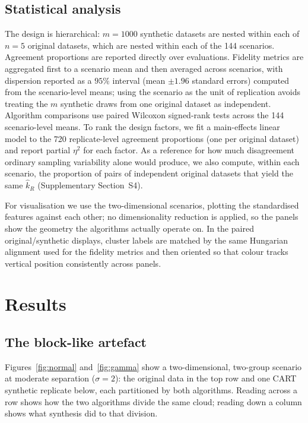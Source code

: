 \documentclass[pdflatex,sn-basic]{sn-jnl}
\begin{document}
\subsection{Statistical analysis}
\label{sec:analysis}

The design is hierarchical: $m = 1000$ synthetic datasets are nested within
each of $n = 5$ original datasets, which are nested within each of the 144
scenarios. Agreement proportions are reported directly over evaluations.
Fidelity metrics are aggregated first to a scenario mean and then averaged
across scenarios, with dispersion reported as a $95\%$ interval (mean $\pm 1.96$
standard errors) computed from the scenario-level means; using the scenario as
the unit of replication avoids treating the $m$ synthetic draws from one
original dataset as independent. Algorithm comparisons use paired Wilcoxon
signed-rank tests across the 144 scenario-level means. To rank the design
factors, we fit a main-effects linear model to the 720 replicate-level
agreement proportions (one per original dataset) and report partial $\eta^2$
for each factor. As a reference for how much disagreement ordinary sampling
variability alone would produce, we also compute, within each scenario, the
proportion of pairs of independent original datasets that yield the same
$\hat{k}_R$ (Supplementary Section~S4).

For visualisation we use the two-dimensional scenarios, plotting the
standardised features against each other; no dimensionality reduction is
applied, so the panels show the geometry the algorithms actually operate on. In
the paired original/synthetic displays, cluster labels are matched by the same
Hungarian alignment used for the fidelity metrics and then oriented so that
colour tracks vertical position consistently across panels.

\section{Results}

\subsection{The block-like artefact}

Figures~\ref{fig:normal} and~\ref{fig:gamma} show a two-dimensional,
two-group scenario at moderate separation ($\sigma = 2$): the original data in
the top row and one CART synthetic replicate below, each partitioned by both
algorithms. Reading across a row shows how the two algorithms divide the same
cloud; reading down a column shows what synthesis did to that division.
\end{document}
